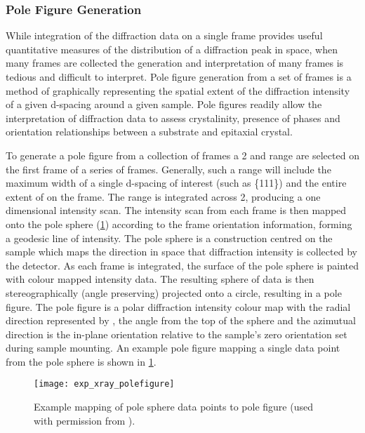 \subsubsection{Pole Figure Generation} While integration of the diffraction data on a single frame provides useful quantitative measures of the distribution of a diffraction peak in space, when many frames are collected the generation and interpretation of many frames is tedious and difficult to interpret.
Pole figure generation from a set of frames is a method of graphically representing the spatial extent of the diffraction intensity of a given d-spacing around a given sample.
Pole figures readily allow the interpretation of diffraction data to assess crystalinity, presence of phases and orientation relationships between a substrate and epitaxial crystal.

To generate a pole figure from a collection of frames a 2\straighttheta{} and \textchi{} range are selected on the first frame of a series of frames.
Generally, such a range will include the maximum width of a single d-spacing of interest (such as \{111\}) and the entire extent of \textchi{} on the frame.
The range is integrated across 2\straighttheta{}, producing a one dimensional intensity scan.
The intensity scan from each frame is then mapped onto the pole sphere (\cref{fig:exp_xray_polefigure}) according to the frame orientation information, forming a geodesic line of intensity.
The pole sphere is a construction centred on the sample which maps the direction in space that diffraction intensity is collected by the detector.
As each frame is integrated, the surface of the pole sphere is painted with colour mapped intensity data.
The resulting sphere of data is then stereographically (angle preserving) projected onto a circle, resulting in a pole figure\cite{He2009}.
The pole figure is a polar diffraction intensity colour map with the radial direction represented by \textalpha{}, the angle from the top of the sphere and the azimutual direction \textphi{} is the in-plane orientation relative to the sample's \textphi{} zero orientation set during sample mounting.
An example pole figure mapping a single data point from the pole sphere is shown in \cref{fig:exp_xray_polefigure}.
\begin{figure}
 \centering \texttt{[image: exp\_xray\_polefigure]}
 \caption[Mapping of pole sphere to pole figure]{\label{fig:exp_xray_polefigure}Example mapping of pole sphere data points to pole figure (used with permission from \cite{He2009}).}
\end{figure}

